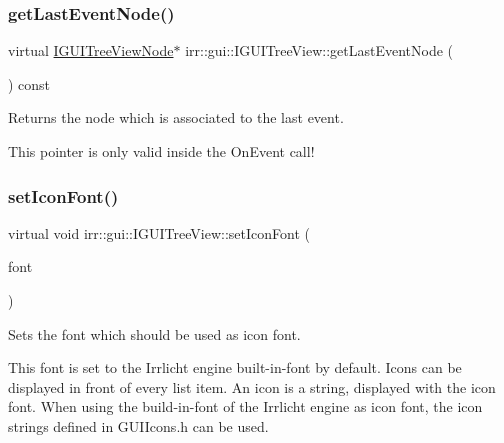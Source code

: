 \subsubsection{\texorpdfstring{get\+Last\+Event\+Node()}{getLastEventNode()}}
{\footnotesize\ttfamily virtual \hyperlink{classirr_1_1gui_1_1IGUITreeViewNode}{I\+G\+U\+I\+Tree\+View\+Node}$\ast$ irr\+::gui\+::\+I\+G\+U\+I\+Tree\+View\+::get\+Last\+Event\+Node (\begin{DoxyParamCaption}{ }\end{DoxyParamCaption}) const\hspace{0.3cm}{\ttfamily [pure virtual]}}



Returns the node which is associated to the last event. 

This pointer is only valid inside the On\+Event call! \mbox{\label{classirr_1_1gui_1_1IGUITreeView_a07707331410d7792557c81c90ef4a09b}} 
\subsubsection{\texorpdfstring{set\+Icon\+Font()}{setIconFont()}}
{\footnotesize\ttfamily virtual void irr\+::gui\+::\+I\+G\+U\+I\+Tree\+View\+::set\+Icon\+Font (\begin{DoxyParamCaption}\item[{\hyperlink{classirr_1_1gui_1_1IGUIFont}{I\+G\+U\+I\+Font} $\ast$}]{font }\end{DoxyParamCaption})\hspace{0.3cm}{\ttfamily [pure virtual]}}



Sets the font which should be used as icon font. 

This font is set to the Irrlicht engine built-\/in-\/font by default. Icons can be displayed in front of every list item. An icon is a string, displayed with the icon font. When using the build-\/in-\/font of the Irrlicht engine as icon font, the icon strings defined in G\+U\+I\+Icons.\+h can be used. \mbox{\label{classirr_1_1gui_1_1IGUITreeView_aaa55170154f44d17e2a8129368c1a010}} 
